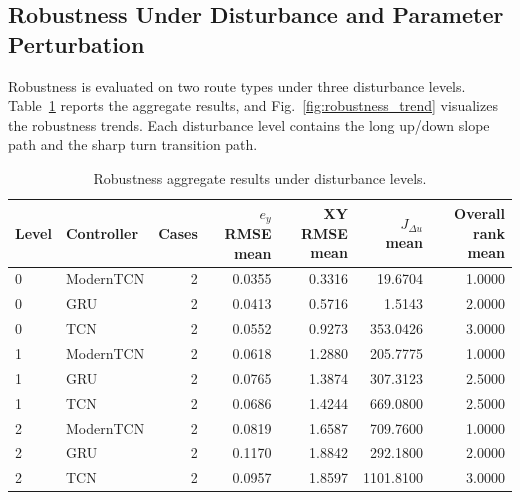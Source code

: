 \documentclass{ieeeaccess}
\begin{document}
\subsection{Robustness Under Disturbance and Parameter Perturbation}



Robustness is evaluated on two route types under three disturbance levels. Table~\ref{tab:robustness_aggregate} reports the aggregate results, and Fig.~\ref{fig:robustness_trend} visualizes the robustness trends. Each disturbance level contains the long up/down slope path and the sharp turn transition path.

\begin{table}[t]

\centering

\caption{Robustness aggregate results under disturbance levels.}

\label{tab:robustness_aggregate}

\begin{tabular}{llrrrrr}

\hline

Level & Controller & Cases & $e_y$ RMSE mean & XY RMSE mean & $J_{\Delta u}$ mean & Overall rank mean \\

\hline

0 & ModernTCN & 2 & 0.0355 & 0.3316 & 19.6704 & 1.0000 \\

0 & GRU & 2 & 0.0413 & 0.5716 & 1.5143 & 2.0000 \\

0 & TCN & 2 & 0.0552 & 0.9273 & 353.0426 & 3.0000 \\

1 & ModernTCN & 2 & 0.0618 & 1.2880 & 205.7775 & 1.0000 \\

1 & GRU & 2 & 0.0765 & 1.3874 & 307.3123 & 2.5000 \\

1 & TCN & 2 & 0.0686 & 1.4244 & 669.0800 & 2.5000 \\

2 & ModernTCN & 2 & 0.0819 & 1.6587 & 709.7600 & 1.0000 \\

2 & GRU & 2 & 0.1170 & 1.8842 & 292.1800 & 2.0000 \\

2 & TCN & 2 & 0.0957 & 1.8597 & 1101.8100 & 3.0000 \\

\hline

\end{tabular}

\end{table}
\end{document}
